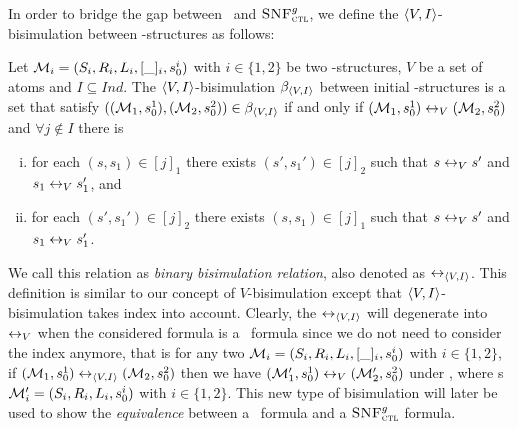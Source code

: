 \documentclass[letterpaper]{article}
\begin{document}
In order to bridge the gap between \CTL\ and ${\textsc{SNF}_{\textsc{ctl}}^g}$, %
we define the ${\langle{V,I}\rangle}$-bisimulation between \Ind-structures as follows:
\begin{definition} \label{def:VInd:bisimulation}
Let ${\cal M}_i=(S_i, R_i, L_i, [\_]_i, s_0^i)$ with $i\in \{1, 2\}$ be two \Ind-structures, $V$ be a set of atoms and $I \subseteq Ind$. The ${\langle{V,I}\rangle}$-bisimulation $\beta_{{\langle{V,I}\rangle}}$ between initial \Ind-structures is a set that satisfy $(({\cal M}_1, s_0^1), ({\cal M}_2, s_0^2)) \in \beta_{{\langle{V,I}\rangle}}$  if and only if $({\cal M}_1, s_0^1) \leftrightarrow_V ({\cal M}_2, s_0^2)$ and $\forall j \notin I$ there is
\begin{enumerate}[(i)]
  \item for each $(s, s_1)\in [j]_1$ there exists $(s',s_1')\in [j]_2$ such that $s\leftrightarrow_V s'$ and $s_1 \leftrightarrow_V s_1'$, and
  \item for each $(s', s_1')\in [j]_2$ there exists $(s,s_1)\in [j]_1$ such that $s\leftrightarrow_V s'$ and $s_1 \leftrightarrow_V s_1'$.
\end{enumerate}
\end{definition}
We call this relation as \emph{binary bisimulation relation}, also denoted as $\leftrightarrow_{{\langle{V,I}\rangle}}$. This definition is similar to our concept of $V$-bisimulation except that  ${\langle{V,I}\rangle}$-bisimulation takes index into account.
Clearly, the $\leftrightarrow_{{\langle{V,I}\rangle}}$ will degenerate into $\leftrightarrow_V$ when the considered formula is a \CTL\ formula since we do not need to consider the index anymore, that is for any two ${\cal M}_i=(S_i, R_i, L_i, [\_]_i, s_0^i)$ with $i\in \{1, 2\}$, if $({\cal M}_1, s_0^1) \leftrightarrow_{{\langle{V,I}\rangle}} ({\cal M}_2, s_0^2)$ then we have $({\cal M}_1', s_0^1) \leftrightarrow_V ({\cal M}_2', s_0^2)$ under \CTL, where s${\cal M}_i'=(S_i, R_i, L_i, s_0^i)$ with $i\in \{1, 2\}$.
This new type of bisimulation will later be used to show the \emph{equivalence} between a \CTL\ formula and a ${\textsc{SNF}_{\textsc{ctl}}^g}$ formula.
\end{document}

